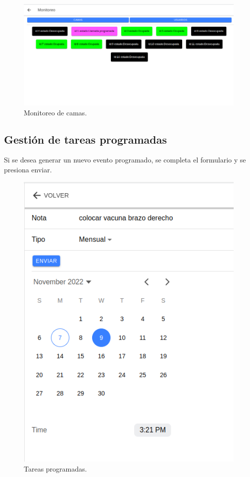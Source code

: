 \begin{figure}[ht]
	\centering
	\includegraphics[scale=.40]{./Figures/monitoreo-camas.png}
	\caption{Monitoreo de camas.}
	\label{fig:Monitoreo de camas.}
\end{figure} 

\subsection{Gestión de tareas programadas}

Si se desea generar un nuevo evento programado, se completa el formulario y se presiona enviar.

\begin{figure}[ht]
	\centering
	\includegraphics[scale=.40]{./Figures/tarea-programada.png}
	\caption{Tareas programadas.}
	\label{fig:Tareas programadas.}
\end{figure} 

